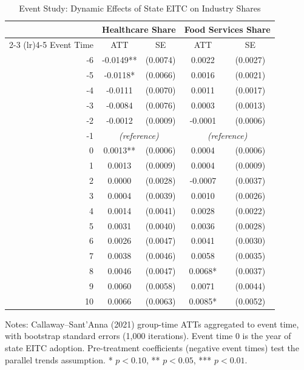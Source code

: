 \begin{table}[H]
\centering
\caption{Event Study: Dynamic Effects of State EITC on Industry Shares}
\label{tab:eventstudy}
\begin{threeparttable}
\begin{tabular}{rcccc}
\toprule
& \multicolumn{2}{c}{Healthcare Share} & \multicolumn{2}{c}{Food Services Share} \\
\cmidrule(lr){2-3} \cmidrule(lr){4-5}
Event Time & ATT & SE & ATT & SE \\
\midrule
-6 & -0.0149** & (0.0074) & 0.0022 & (0.0027) \\
-5 & -0.0118* & (0.0066) & 0.0016 & (0.0021) \\
-4 & -0.0111 & (0.0070) & 0.0011 & (0.0017) \\
-3 & -0.0084 & (0.0076) & 0.0003 & (0.0013) \\
-2 & -0.0012 & (0.0009) & -0.0001 & (0.0006) \\
-1 & \multicolumn{2}{c}{\textit{(reference)}} & \multicolumn{2}{c}{\textit{(reference)}} \\
0 & 0.0013** & (0.0006) & 0.0004 & (0.0006) \\
1 & 0.0013 & (0.0009) & 0.0004 & (0.0009) \\
2 & 0.0000 & (0.0028) & -0.0007 & (0.0037) \\
3 & 0.0004 & (0.0039) & 0.0010 & (0.0026) \\
4 & 0.0014 & (0.0041) & 0.0028 & (0.0022) \\
5 & 0.0031 & (0.0040) & 0.0036 & (0.0028) \\
6 & 0.0026 & (0.0047) & 0.0041 & (0.0030) \\
7 & 0.0038 & (0.0046) & 0.0058 & (0.0035) \\
8 & 0.0046 & (0.0047) & 0.0068* & (0.0037) \\
9 & 0.0060 & (0.0058) & 0.0071 & (0.0044) \\
10 & 0.0066 & (0.0063) & 0.0085* & (0.0052) \\
\bottomrule
\end{tabular}
\begin{tablenotes}[flushleft]
\small
\item Notes: Callaway--Sant'Anna (2021) group-time ATTs aggregated to event time, with bootstrap standard errors (1,000 iterations). Event time 0 is the year of state EITC adoption. Pre-treatment coefficients (negative event times) test the parallel trends assumption. * $p<0.10$, ** $p<0.05$, *** $p<0.01$.
\end{tablenotes}
\end{threeparttable}
\end{table}
